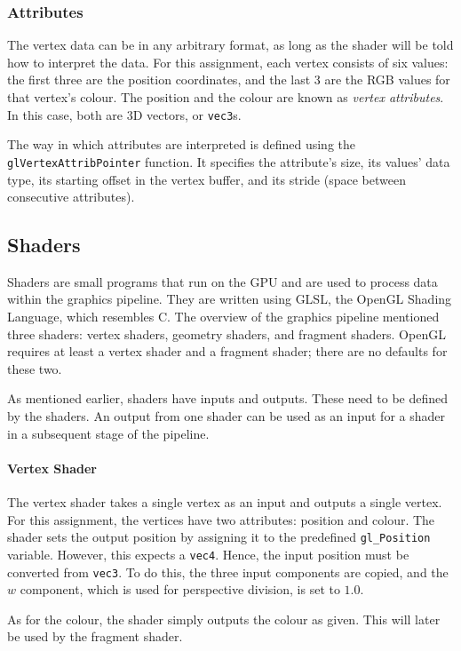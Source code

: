 \documentclass[a4paper, 12pt]{scrartcl}
\begin{document}
\subsubsection{Attributes}
The vertex data can be in any arbitrary format, as long as the shader will be told how to interpret the data. For this assignment, each vertex consists of six values: the first three are the position coordinates, and the last 3 are the RGB values for that vertex's colour. The position and the colour are known as \textit{vertex attributes}. In this case, both are 3D vectors, or \texttt{vec3}s.

The way in which attributes are interpreted is defined using the \texttt{glVertexAttribPointer} function. It specifies the attribute's size, its values' data type, its starting offset in the vertex buffer, and its stride (space between consecutive attributes).

\subsection{Shaders}
Shaders are small programs that run on the GPU and are used to process data within the graphics pipeline. They are written using GLSL, the OpenGL Shading Language, which resembles C. The overview of the graphics pipeline mentioned three shaders: vertex shaders, geometry shaders, and fragment shaders. OpenGL requires at least a vertex shader and a fragment shader; there are no defaults for these two.

As mentioned earlier, shaders have inputs and outputs. These need to be defined by the shaders. An output from one shader can be used as an input for a shader in a subsequent stage of the pipeline.

\paragraph{Vertex Shader}
The vertex shader takes a single vertex as an input and outputs a single vertex. For this assignment, the vertices have two attributes: position and colour. The shader sets the output position by assigning it to the predefined \texttt{gl\_Position} variable. However, this expects a \texttt{vec4}. Hence, the input position must be converted from \texttt{vec3}. To do this, the three input components are copied, and the $w$ component, which is used for perspective division, is set to $1.0$.

As for the colour, the shader simply outputs the colour as given. This will later be used by the fragment shader.
\end{document}
